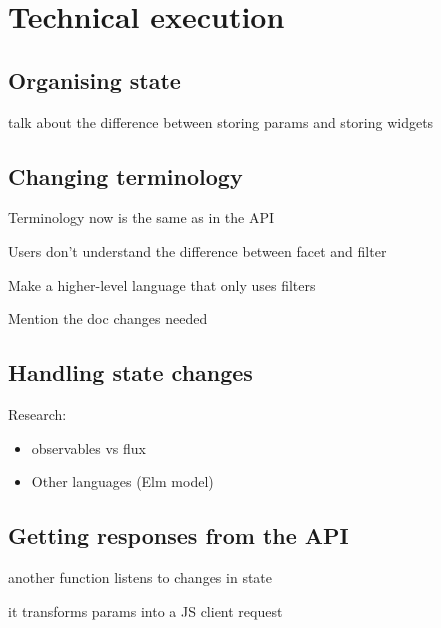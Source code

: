 
\chapter{Technical execution} %
\label{chp:execution}

\section{Organising state} %
\label{sec:organising_state}

talk about the difference between storing params and storing widgets


\section{Changing terminology} %
\label{sec:changing_terminology}

Terminology now is the same as in the API

Users don't understand the difference between facet and filter

Make a higher-level language that only uses filters

Mention the doc changes needed


\section{Handling state changes} %
\label{sec:handling_state_changes}

Research:

\begin{itemize}
  \item observables vs flux
  \item Other languages (Elm model)
\end{itemize}


\section{Getting responses from the API} %
\label{sec:getting_responses_from_the_api}

another function listens to changes in state

it transforms params into a JS client request

